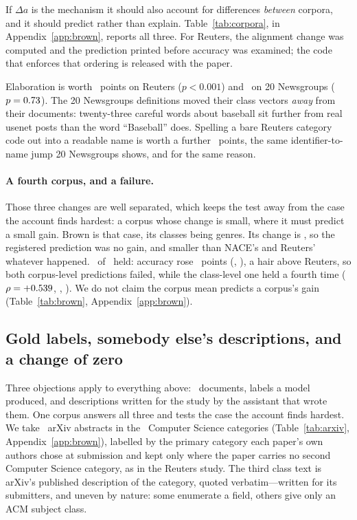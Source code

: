 \documentclass[11pt]{article}
\begin{document}
If $\Delta a$ is the mechanism it should also account for differences
\emph{between} corpora, and it should predict rather than explain.
Table~\ref{tab:corpora}, in Appendix~\ref{app:brown}, reports all three. For Reuters, the alignment change was
computed and the prediction printed before accuracy was examined; the code that
enforces that ordering is released with the paper.

Elaboration is worth \ReutersGain~points on Reuters ($p < 0.001$) and
\NewsGain\ on 20 Newsgroups ($p = 0.73$). The 20 Newsgroups definitions moved
their class vectors \emph{away} from their documents: twenty-three careful words
about baseball sit further from real usenet posts than the word ``Baseball''
does. Spelling a bare Reuters category code out into a readable name is worth a
further \ReutersCodeGain~points, the same identifier-to-name jump 20 Newsgroups
shows, and for the same reason.

\paragraph{A fourth corpus, and a failure.} Those three changes are well
separated, which keeps the test away from the case the account finds hardest: a
corpus whose change is small, where it must predict a small gain. Brown is that
case, its classes being genres. Its change is \BrownAlign, so the registered
prediction was no gain, and smaller than NACE's and Reuters' whatever happened.
\BrownHeld\ of \BrownPredictions\ held: accuracy rose \BrownDefGain~points
(\BrownDefPStat, \HolmBrownDefStat), a hair above Reuters, so both
corpus-level predictions failed, while the class-level one held a fourth time
($\rho = +0.539$, \BrownRhoPStat, \HolmBrownRhoStat). We do not claim the
corpus mean predicts a corpus's gain (Table~\ref{tab:brown},
Appendix~\ref{app:brown}).

\subsection{Gold labels, somebody else's descriptions, and a change of zero}
\label{sec:arxiv}

Three objections apply to everything above: \NEVAL\ documents, labels a model
produced, and descriptions written for the study by the assistant that wrote
them. One corpus answers all three and tests the case the account finds hardest.
We take \ArxivN\ arXiv abstracts in the \ArxivClasses\ Computer Science
categories (Table~\ref{tab:arxiv}, Appendix~\ref{app:brown}), labelled by the
primary category each paper's own authors chose at submission and kept only where the paper carries no second Computer Science
category, as in the Reuters study. The third class text is arXiv's published
description of the category, quoted verbatim---written for its submitters, and
uneven by nature: some enumerate a field, others give only an ACM subject
class.
\end{document}
